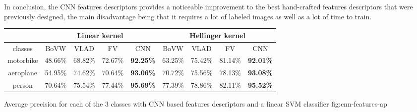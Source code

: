 \documentclass{article}
\begin{document}
In conclusion, the CNN features descriptors provides a noticeable
improvement to the best hand-crafted features descriptors that were
previously designed, the main disadvantage being that it requires a
lot of labeled images as well as a lot of time to train.

\begin{table}[h!]
  \centering
  \begin{tabular}{| c | c | c | c | c || c | c | c | c |}
    \hline
    & \multicolumn{4}{c||}{Linear kernel} & \multicolumn{4}{c|}{Hellinger kernel} \\
    \hline
    classes & BoVW & VLAD & FV & CNN & BoVW & VLAD & FV & CNN \\
    \hline
    motorbike  & 48.66\% & 68.82\% & 72.67\% & \textbf{92.25\%} & 63.25\% & 75.42\% & 81.14\% & \textbf{92.01\%}\\
    aeroplane  & 54.95\% & 74.62\% & 70.64\% & \textbf{93.06\%} & 70.72\% & 75.56\% & 78.13\% & \textbf{93.08\%}\\
    person     & 70.64\% & 75.54\% & 77.44\% & \textbf{95.69\%} & 77.39\% & 78.86\% & 82.11\% & \textbf{95.52\%}\\
    \hline
  \end{tabular}
   \label{tab:cnn-features}
\end{table}

\triplefign
  {}
  {}
  {}
  {Average precision for each of the 3 classes with CNN based features
    descriptors and a linear SVM classifier}
  {fig:cnn-features-ap}
\end{document}
